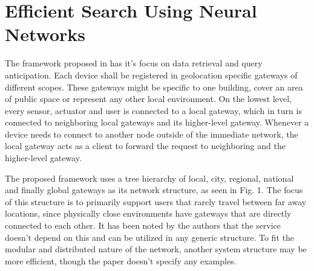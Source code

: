 \documentclass [journal]{IEEEtran}
\begin{document}
 \section{Efficient Search Using Neural Networks}
The framework proposed in \cite{main} has it's focus on data retrieval and query anticipation. Each device shall be registered in geolocation specific gateways of different scopes. These gateways might be specific to one building, cover an area of public space or represent any other local environment. On the lowest level, every sensor, actuator and user is connected to a local gateway, which in turn is connected to neighboring local gateways and its higher-level gateway. Whenever a device needs to connect to another node outside of the immediate network, the local gateway acts as a client to forward the request to neighboring and the higher-level gateway. \par
The proposed framework uses a tree hierarchy of local, city, regional, national and finally global gateways as its network structure, as seen in Fig. 1. The focus of this structure is to primarily support users that rarely travel between far away locations, since physically close environments have gateways that are directly connected to each other. It has been noted by the authors that the service doesn't depend on this and can be utilized in any generic structure. To fit the modular and distributed nature of the network, another system structure may be more efficient, though the paper doesn't specify any examples. \par
\end{document}
